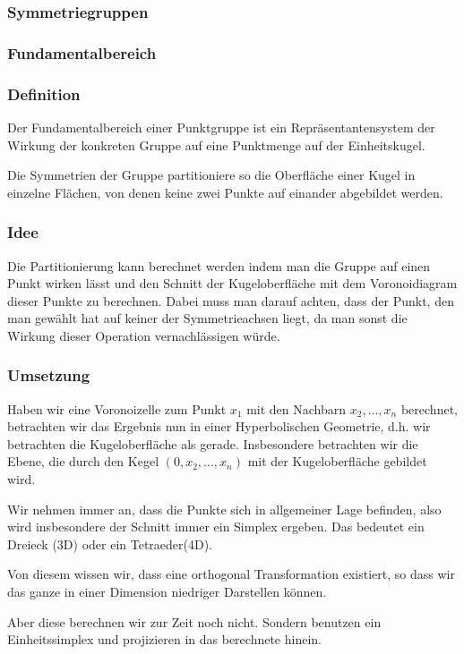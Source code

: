     \subsubsection{Symmetriegruppen}
    \subsubsection{Fundamentalbereich}
        \subsubsection*{Definition}
            Der Fundamentalbereich einer Punktgruppe ist ein Repräsentantensystem der Wirkung der konkreten Gruppe auf eine Punktmenge auf der Einheitskugel.

            Die Symmetrien der Gruppe partitioniere so die Oberfläche einer Kugel in einzelne Flächen, von denen keine zwei Punkte auf einander abgebildet werden.
        \subsubsection*{Idee}
            Die Partitionierung kann berechnet werden indem man die Gruppe auf einen Punkt wirken lässt und den Schnitt der Kugeloberfläche mit dem Voronoidiagram dieser Punkte zu berechnen. Dabei muss man darauf achten, dass der Punkt, den man gewählt hat auf keiner der Symmetrieachsen liegt, da man sonst die Wirkung dieser Operation vernachlässigen würde.
        \subsubsection*{Umsetzung}
            Haben wir eine Voronoizelle zum Punkt $x_1$ mit den Nachbarn $x_2, \dots, x_n$ berechnet, betrachten wir das Ergebnis nun in einer Hyperbolischen Geometrie, d.h. wir betrachten die Kugeloberfläche als gerade. Insbesondere betrachten wir die Ebene, die durch den Kegel $(0, x_2, \dots, x_n)$ mit der Kugeloberfläche gebildet wird.

            Wir nehmen immer an, dass die Punkte sich in allgemeiner Lage befinden, also wird insbesondere der Schnitt immer ein Simplex ergeben. Das bedeutet ein Dreieck (3D) oder ein Tetraeder(4D).

            Von diesem wissen wir, dass eine orthogonal Transformation existiert, so dass wir das ganze in einer Dimension niedriger Darstellen können.

            Aber diese berechnen wir zur Zeit noch nicht. Sondern benutzen ein Einheitssimplex und projizieren in das berechnete hinein.
